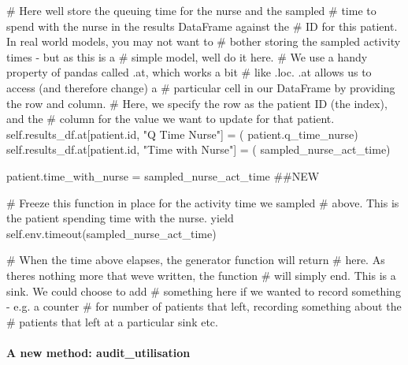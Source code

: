 \documentclass[
  letterpaper,
  DIV=11,
  numbers=noendperiod]{scrreprt}
\let\oldparagraph\paragraph
\renewcommand{\paragraph}[1]{\oldparagraph{#1}\mbox{}}
\newenvironment{Shaded}{}{}
\newcommand{\BuiltInTok}[1]{\textcolor[rgb]{0.84,0.23,0.29}{#1}}
\newcommand{\CommentTok}[1]{\textcolor[rgb]{0.42,0.45,0.49}{#1}}
\newcommand{\ControlFlowTok}[1]{\textcolor[rgb]{0.84,0.23,0.29}{#1}}
\newcommand{\NormalTok}[1]{\textcolor[rgb]{0.14,0.16,0.18}{#1}}
\newcommand{\OperatorTok}[1]{\textcolor[rgb]{0.14,0.16,0.18}{#1}}
\newcommand{\StringTok}[1]{\textcolor[rgb]{0.01,0.18,0.38}{#1}}
\newcommand{\VariableTok}[1]{\textcolor[rgb]{0.89,0.38,0.04}{#1}}
\begin{document}
\begin{Shaded}
\begin{Highlighting}[]
        \CommentTok{\# Here we\textquotesingle{}ll store the queuing time for the nurse and the sampled}
        \CommentTok{\# time to spend with the nurse in the results DataFrame against the}
        \CommentTok{\# ID for this patient.  In real world models, you may not want to}
        \CommentTok{\# bother storing the sampled activity times {-} but as this is a}
        \CommentTok{\# simple model, we\textquotesingle{}ll do it here.}
        \CommentTok{\# We use a handy property of pandas called .at, which works a bit}
        \CommentTok{\# like .loc.  .at allows us to access (and therefore change) a}
        \CommentTok{\# particular cell in our DataFrame by providing the row and column.}
        \CommentTok{\# Here, we specify the row as the patient ID (the index), and the}
        \CommentTok{\# column for the value we want to update for that patient.}
        \VariableTok{self}\NormalTok{.results\_df.at[patient.}\BuiltInTok{id}\NormalTok{, }\StringTok{"Q Time Nurse"}\NormalTok{] }\OperatorTok{=}\NormalTok{ (}
\NormalTok{            patient.q\_time\_nurse)}
        \VariableTok{self}\NormalTok{.results\_df.at[patient.}\BuiltInTok{id}\NormalTok{, }\StringTok{"Time with Nurse"}\NormalTok{] }\OperatorTok{=}\NormalTok{ (}
\NormalTok{            sampled\_nurse\_act\_time)}

\NormalTok{        patient.time\_with\_nurse }\OperatorTok{=}\NormalTok{ sampled\_nurse\_act\_time }\CommentTok{\#\#NEW}

        \CommentTok{\# Freeze this function in place for the activity time we sampled}
        \CommentTok{\# above.  This is the patient spending time with the nurse.}
        \ControlFlowTok{yield} \VariableTok{self}\NormalTok{.env.timeout(sampled\_nurse\_act\_time)}

        \CommentTok{\# When the time above elapses, the generator function will return}
        \CommentTok{\# here.  As there\textquotesingle{}s nothing more that we\textquotesingle{}ve written, the function}
        \CommentTok{\# will simply end.  This is a sink.  We could choose to add}
        \CommentTok{\# something here if we wanted to record something {-} e.g. a counter}
        \CommentTok{\# for number of patients that left, recording something about the}
        \CommentTok{\# patients that left at a particular sink etc.}
\end{Highlighting}
\end{Shaded}

\paragraph{A new method:
audit\_utilisation}\label{a-new-method-audit_utilisation}
\end{document}
